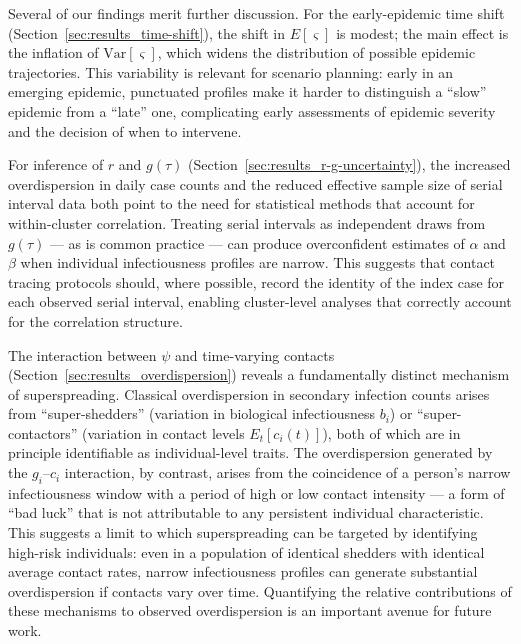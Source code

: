 Several of our findings merit further discussion. For the early-epidemic time shift (Section~\ref{sec:results_time-shift}), the shift in $E[\varsigma]$ is modest; the main effect is the inflation of $\text{Var}[\varsigma]$, which widens the distribution of possible epidemic trajectories. This variability is relevant for scenario planning: early in an emerging epidemic, punctuated profiles make it harder to distinguish a ``slow'' epidemic from a ``late'' one, complicating early assessments of epidemic severity and the decision of when to intervene.

For inference of $r$ and $g(\tau)$ (Section~\ref{sec:results_r-g-uncertainty}), the increased overdispersion in daily case counts and the reduced effective sample size of serial interval data both point to the need for statistical methods that account for within-cluster correlation. Treating serial intervals as independent draws from $g(\tau)$ --- as is common practice --- can produce overconfident estimates of $\alpha$ and $\beta$ when individual infectiousness profiles are narrow. This suggests that contact tracing protocols should, where possible, record the identity of the index case for each observed serial interval, enabling cluster-level analyses that correctly account for the correlation structure.

The interaction between $\psi$ and time-varying contacts (Section~\ref{sec:results_overdispersion}) reveals a fundamentally distinct mechanism of superspreading. Classical overdispersion in secondary infection counts arises from ``super-shedders'' (variation in biological infectiousness $b_i$) or ``super-contactors'' (variation in contact levels $E_t[c_i(t)]$), both of which are in principle identifiable as individual-level traits. The overdispersion generated by the $g_i$--$c_i$ interaction, by contrast, arises from the coincidence of a person's narrow infectiousness window with a period of high or low contact intensity --- a form of ``bad luck'' that is not attributable to any persistent individual characteristic. This suggests a limit to which superspreading can be targeted by identifying high-risk individuals: even in a population of identical shedders with identical average contact rates, narrow infectiousness profiles can generate substantial overdispersion if contacts vary over time. Quantifying the relative contributions of these mechanisms to observed overdispersion is an important avenue for future work.

